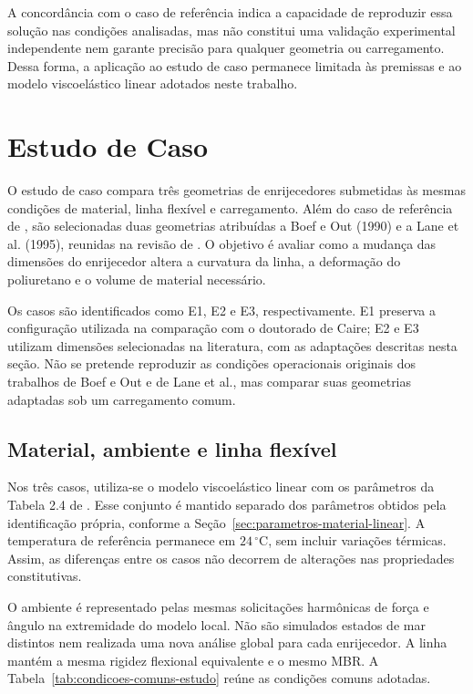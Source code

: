 \documentclass[arial,centeredequations,english,brazilian,oneside,section=TITLE]{ifes8}
\begin{document}
A concordância com o caso de referência indica a capacidade de reproduzir
essa solução nas condições analisadas, mas não constitui uma validação
experimental independente nem garante precisão para qualquer geometria ou
carregamento. Dessa forma, a aplicação ao estudo de caso permanece limitada
às premissas e ao modelo viscoelástico linear adotados neste trabalho.


\section{Estudo de Caso}
\label{sec:estudo-de-caso}

O estudo de caso compara três geometrias de enrijecedores submetidas às mesmas
condições de material, linha flexível e carregamento. Além do caso de referência
de , são selecionadas duas geometrias atribuídas a Boef
e Out (1990) e a Lane et al. (1995), reunidas na revisão de
. O objetivo é avaliar como a mudança das dimensões
do enrijecedor altera a curvatura da linha, a deformação do poliuretano e o volume
de material necessário.

Os casos são identificados como E1, E2 e E3, respectivamente. E1 preserva a
configuração utilizada na comparação com o doutorado de Caire; E2 e E3 utilizam
dimensões selecionadas na literatura, com as adaptações descritas nesta seção.
Não se pretende reproduzir as condições operacionais originais dos trabalhos
de Boef e Out e de Lane et al., mas comparar suas geometrias adaptadas sob
um carregamento comum.

\subsection{Material, ambiente e linha flexível}
\label{sec:material-ambiente-linha-flexivel}

Nos três casos, utiliza-se o modelo viscoelástico linear com os parâmetros
da Tabela 2.4 de . Esse conjunto é mantido separado
dos parâmetros obtidos pela identificação própria, conforme a
Seção~\ref{sec:parametros-material-linear}. A temperatura de referência
permanece em $24\,^{\circ}\mathrm{C}$, sem incluir variações térmicas.
Assim, as diferenças entre os casos não decorrem de alterações nas
propriedades constitutivas.

O ambiente é representado pelas mesmas solicitações harmônicas de força e
ângulo na extremidade do modelo local. Não são simulados estados de mar
distintos nem realizada uma nova análise global para cada enrijecedor.
A linha mantém a mesma rigidez flexional equivalente e o mesmo MBR.
A Tabela~\ref{tab:condicoes-comuns-estudo} reúne as condições comuns adotadas.
\end{document}

